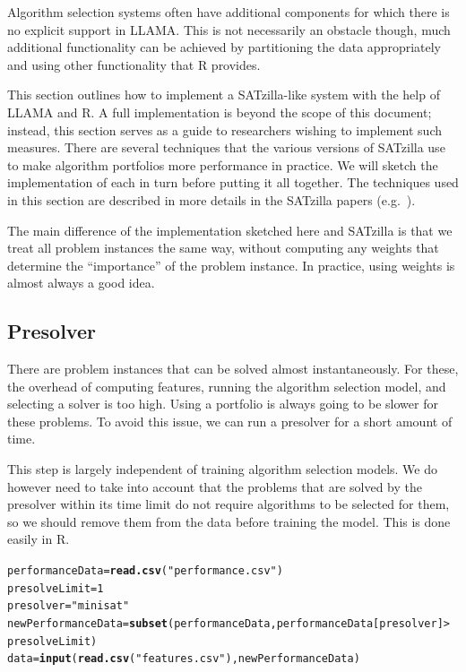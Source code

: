 \documentclass{article}\usepackage[]{graphicx}\usepackage[]{color}
\makeatletter
\newcommand{\hlnum}[1]{\textcolor[rgb]{0.686,0.059,0.569}{#1}}%
\newcommand{\hlstr}[1]{\textcolor[rgb]{0.192,0.494,0.8}{#1}}%
\newcommand{\hlopt}[1]{\textcolor[rgb]{0,0,0}{#1}}%
\newcommand{\hlstd}[1]{\textcolor[rgb]{0.345,0.345,0.345}{#1}}%
\newcommand{\hlkwb}[1]{\textcolor[rgb]{0.69,0.353,0.396}{#1}}%
\newcommand{\hlkwd}[1]{\textcolor[rgb]{0.737,0.353,0.396}{\textbf{#1}}}%
\newenvironment{kframe}{%
 \def\at@end@of@kframe{}%
 \ifinner\ifhmode%
  \def\at@end@of@kframe{\end{minipage}}%
  \begin{minipage}{\columnwidth}%
 \fi\fi%
 \def\FrameCommand##1{\hskip\@totalleftmargin \hskip-\fboxsep
 \colorbox{shadecolor}{##1}\hskip-\fboxsep
     \hskip-\linewidth \hskip-\@totalleftmargin \hskip\columnwidth}%
 \MakeFramed {\advance\hsize-\width
   \@totalleftmargin\z@ \linewidth\hsize
   \@setminipage}}%
 {\par\unskip\endMakeFramed%
 \at@end@of@kframe}
\newenvironment{knitrout}{}{} %
\makeatother
\begin{document}
Algorithm selection systems often have additional components for which there is
no explicit support in LLAMA. This is not necessarily an obstacle though, much
additional functionality can be achieved by partitioning the data appropriately
and using other functionality that R provides.

This section outlines how to implement a SATzilla-like system with the help of
LLAMA and R. A full implementation is beyond the scope of this document;
instead, this section serves as a guide to researchers wishing to implement such
measures. There are several techniques that the various versions of SATzilla use
to make algorithm portfolios more performance in practice. We will sketch the
implementation of each in turn before putting it all together. The techniques
used in this section are described in more details in the SATzilla papers
(e.g.~\cite{xu_satzilla_2008,xu_hierarchical_2007,xu_hydra-mip_2011}).

The main difference of the implementation sketched here and SATzilla is that we
treat all problem instances the same way, without computing any weights that
determine the ``importance'' of the problem instance. In practice, using weights
is almost always a good idea.

\subsection{Presolver}

There are problem instances that can be solved almost instantaneously. For
these, the overhead of computing features, running the algorithm selection
model, and selecting a solver is too high. Using a portfolio is always going to
be slower for these problems. To avoid this issue, we can run a presolver for a
short amount of time.

This step is largely independent of training algorithm selection models. We do
however need to take into account that the problems that are solved by the
presolver within its time limit do not require algorithms to be selected for
them, so we should remove them from the data before training the model. This is
done easily in R.

\begin{knitrout}
\color{fgcolor}\begin{kframe}
\begin{alltt}
\hlstd{performanceData} \hlkwb{=} \hlkwd{read.csv}\hlstd{(}\hlstr{"performance.csv"}\hlstd{)}
\hlstd{presolveLimit} \hlkwb{=} \hlnum{1}
\hlstd{presolver} \hlkwb{=} \hlstr{"minisat"}
\hlstd{newPerformanceData} \hlkwb{=} \hlkwd{subset}\hlstd{(performanceData, performanceData[presolver]} \hlopt{>}
    \hlstd{presolveLimit)}
\hlstd{data} \hlkwb{=} \hlkwd{input}\hlstd{(}\hlkwd{read.csv}\hlstd{(}\hlstr{"features.csv"}\hlstd{), newPerformanceData)}
\end{alltt}
\end{kframe}
\end{knitrout}
\end{document}
